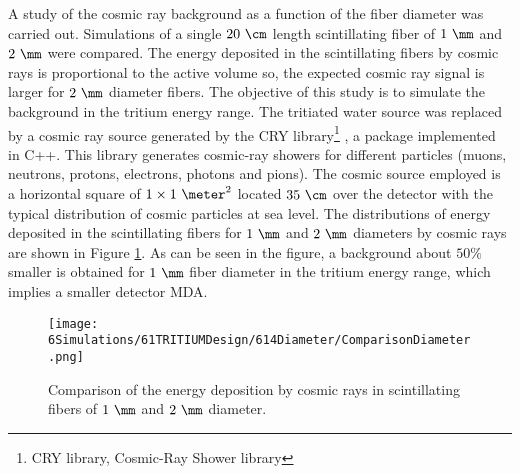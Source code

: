 A study of the cosmic ray background as a function of the fiber diameter was carried out. Simulations of a single $20~\cm$ length scintillating fiber of $1~\mm$ and $2~\mm$ were compared. The energy deposited in the scintillating fibers by cosmic rays is proportional to the active volume so, the expected cosmic ray signal is larger for $2~\mm$ diameter fibers. The objective of this study is to simulate the background in the tritium energy range. The tritiated water source was replaced by a cosmic ray source generated by the CRY library\footnote{CRY library, Cosmic-Ray Shower library} \cite{CRYwebsite, CRYpaper}, a package implemented in C++. This library generates cosmic-ray showers for different particles (muons, neutrons, protons, electrons, photons and pions). The cosmic source employed is a horizontal square of $1 \times 1~\meter ^2$ located $35~\cm$ over the detector with the typical distribution of cosmic particles at sea level. The distributions of energy deposited in the scintillating fibers for $1~\mm$ and $2~\mm$ diameters by cosmic rays are shown in Figure \ref{fig:DiameterComparison}. As can be seen in the figure, a background about $50\%$ smaller is obtained for $1~\mm$ fiber diameter in the tritium energy range, which implies a smaller detector MDA. %

\begin{figure}[hbtp]
\centering
\texttt{[image: 6Simulations/61TRITIUMDesign/614Diameter/ComparisonDiameter.png]}
\caption{Comparison of the energy deposition by cosmic rays in scintillating fibers of $1~\mm$ and $2~\mm$ diameter.\label{fig:DiameterComparison}}
\end{figure}
